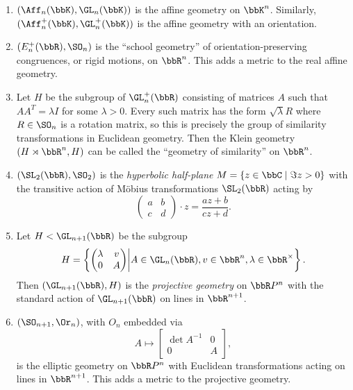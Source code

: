 \begin{example}
    \begin{enumerate}
        \item $(\Aff_n(\bbK), \GL_n(\bbK))$ is the affine geometry on $\bbK^n$. Similarly, $(\Aff_n^+(\bbK), \GL_n^+(\bbK))$ is the affine geometry with an orientation.

        \item $(E_n^+(\bbR),\SO_n)$ is the ``school geometry'' of orientation-preserving congruences, or rigid motions, on $\bbR^n$. This adds a metric to the real affine geometry.

        \item Let $H$ be the subgroup of $\GL_n^+(\bbR)$ consisting of matrices $A$ such that $AA^T=\lambda I$ for some $\lambda>0$. Every such matrix has the form $\sqrt{\lambda}R$ where $R\in\SO_n$ is a rotation matrix, so this is precisely the group of similarity transformations in Euclidean geometry. Then the Klein geometry $(H\rtimes \bbR^n,H)$ can be called the ``geometry of similarity'' on $\bbR^n$.
        
        \item $(\SL_2(\bbR),\SO_2)$ is the \emph{hyperbolic half-plane} $M=\{z\in \bbC\mid \Im z>0\}$ with the transitive action of M\"obius transformations $\SL_2(\bbR)$ acting by 
        \[\begin{pmatrix}
            a&b\\c&d
        \end{pmatrix}\cdot z=\frac{az+b}{cz+d}.\]

        \item Let $H<\GL_{n+1}(\bbR)$ be the subgroup
        \[H=\left\{\begin{pmatrix}
            \lambda& v\\ 0&A
        \end{pmatrix}
        \middle| A\in\GL_n(\bbR),v\in\bbR^n,\lambda\in \bbR^\times \right\}.\]
        Then $(\GL_{n+1}(\bbR),H)$ is the \emph{projective geometry} on $\bbR P^n$ with the standard action of $\GL_{n+1}(\bbR)$ on lines in $\bbR^{n+1}$.
        
        \item $(\SO_{n+1},\Or_n)$, with $O_n$ embedded via
        \[A\mapsto \begin{bmatrix}
            \det A^{-1}&0\\0& A
        \end{bmatrix},\]
        is the elliptic geometry on $\bbR P^n$ with Euclidean transformations acting on lines in $\bbR^{n+1}$. This adds a metric to the projective geometry.


\end{enumerate}
\end{example}

